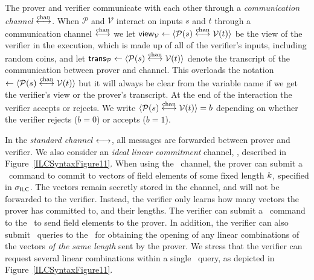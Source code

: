 The prover and verifier communicate with each other through a \emph{communication channel} $\overset{\textnormal{chan}}{\longleftrightarrow}$. When $\mathcal{P}$ and $\mathcal{V}$ interact on inputs $s$ and $t$ through a communication channel $\overset{\textnormal{chan}}{\longleftrightarrow}$ we let $\mathsf{view}_{\mathcal{V}} \leftarrow \langle \mathcal{P}(s) \overset{\textnormal{chan}}{\longleftrightarrow} \mathcal{V}(t)\rangle$ be the view of the verifier in the execution, which is made up of all of the verifier's inputs, including random coins, and let $\mathsf{trans}_{\mathcal{P}} \leftarrow  \langle \mathcal{P}(s) \overset{\textnormal{chan}}{\longleftrightarrow} \mathcal{V}(t)\rangle$ denote the transcript of the communication between prover and channel. This overloads the notation $\leftarrow  \langle \mathcal{P}(s) \overset{\textnormal{chan}}{\longleftrightarrow} \mathcal{V}(t)\rangle$ but it will always be clear from the variable name if we get the verifier's view or the prover's transcript. At the end of the interaction the verifier accepts or rejects. We write $\langle \mathcal{P}(s)\overset{\textnormal{chan}}{\longleftrightarrow} \mathcal{V}(t)\rangle =b$ depending on whether the verifier rejects ($b=0$) or accepts ($b=1$).

In the \emph{standard channel} $\longleftrightarrow$, all messages are forwarded between prover and verifier. 
We also consider an \emph{ideal linear commitment}  channel, \ILC, described in Figure~\ref{ILCSyntaxFigure11}. 
When using the \ILC\ channel, the prover can submit a \ILCcommit\ command to commit to 
vectors of field elements of some fixed length $k$, specified in $\mathsf{\sigma}_{\mathsf{ILC}}$. The vectors remain secretly stored in the channel, and will not be forwarded to the verifier. Instead, the verifier only learns how many vectors the prover has committed to, and their lengths. The verifier can submit a \ILCsend\ command to the \ILC\ to send field elements to the prover. In addition, the verifier can also submit \ILCopen\ queries to the \ILC\ for obtaining the opening of any linear combinations of the vectors \emph{of the same length} sent by the prover. We stress that the verifier can request several linear combinations within a single \ILCopen\ query, as depicted in Figure~\ref{ILCSyntaxFigure11}.

